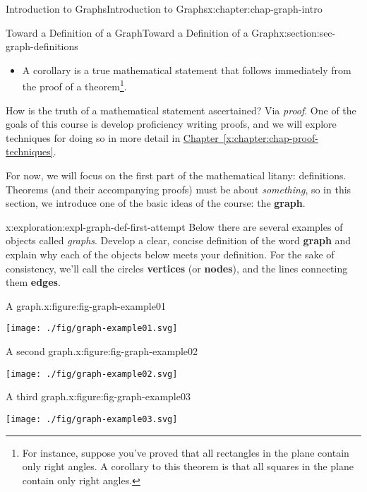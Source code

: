 \documentclass[oneside,10pt,]{book}
\newcommand{\xreffont}{\relax}
\newcommand{\terminology}[1]{\textbf{#1}}
\begin{document}
\begin{chapterptx}{Introduction to Graphs}{}{Introduction to Graphs}{}{}{x:chapter:chap-graph-intro}
\begin{sectionptx}{Toward a Definition of a Graph}{}{Toward a Definition of a Graph}{}{}{x:section:sec-graph-definitions}
\begin{introduction}{}
\begin{itemize}[label=\textbullet]
\item{}A corollary is a true mathematical statement that follows immediately from the proof of a theorem\footnote{For instance, suppose you've proved that all rectangles in the plane contain only right angles. A corollary to this theorem is that all squares in the plane contain only right angles.\label{g:fn:idp105545050293136}}.%
\end{itemize}
%
\par
How is the truth of a mathematical statement ascertained? Via \emph{proof}. One of the goals of this course is develop proficiency writing proofs, and we will explore techniques for doing so in more detail in \hyperref[x:chapter:chap-proof-techniques]{Chapter~{\xreffont\ref{x:chapter:chap-proof-techniques}}}.%
\par
For now, we will focus on the first part of the mathematical litany: definitions. Theorems (and their accompanying proofs) must be about \emph{something}, so in this section, we introduce one of the basic ideas of the course: the \terminology{graph}.%
\end{introduction}%
\begin{exploration}{}{x:exploration:expl-graph-def-first-attempt}%
Below there are several examples of objects called \emph{graphs}. Develop a clear, concise definition of the word \terminology{graph} and explain why each of the objects below meets your definition. For the sake of consistency, we'll call the circles \terminology{vertices} (or \terminology{nodes}), and the lines connecting them \terminology{edges}.%
\begin{figureptx}{A graph.}{x:figure:fig-graph-example01}{}%
\begin{image}{0.375}{0.25}{0.375}%
\texttt{[image: ./fig/graph-example01.svg]}
\end{image}%
\tcblower
\end{figureptx}%
\begin{figureptx}{A second graph.}{x:figure:fig-graph-example02}{}%
\begin{image}{0.375}{0.25}{0.375}%
\texttt{[image: ./fig/graph-example02.svg]}
\end{image}%
\tcblower
\end{figureptx}%
\begin{figureptx}{A third graph.}{x:figure:fig-graph-example03}{}%
\begin{image}{0.375}{0.25}{0.375}%
\texttt{[image: ./fig/graph-example03.svg]}
\end{image}%

\end{figureptx}
\end{exploration}
\end{sectionptx}
\end{chapterptx}
\end{document}
